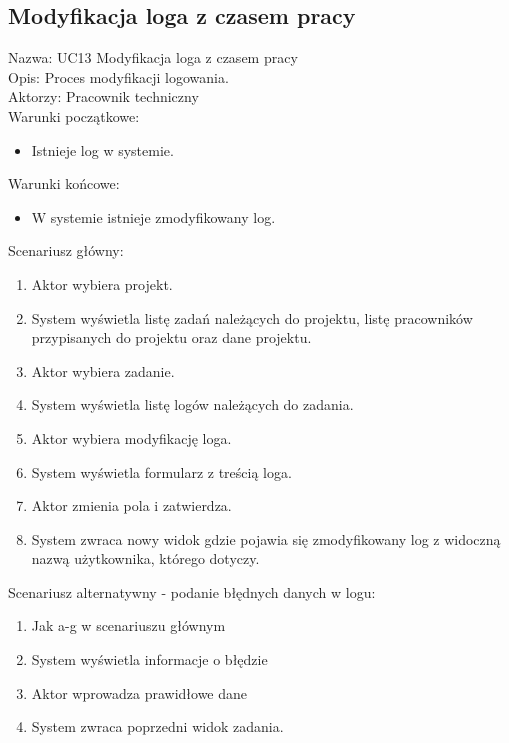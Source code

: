 \subsection{Modyfikacja loga z czasem pracy}
\begin{adjustwidth}{5em}{0pt}
Nazwa: UC13 Modyfikacja loga z czasem pracy \\
Opis: Proces modyfikacji logowania.\\
Aktorzy: Pracownik techniczny \\
Warunki początkowe:
\begin{itemize}
\item Istnieje log w systemie.
\end{itemize}
Warunki końcowe:
\begin{itemize}
\item W systemie istnieje zmodyfikowany log.
\end{itemize}
Scenariusz główny:
\begin{enumerate}
\item Aktor wybiera projekt.
\item System wyświetla listę zadań należących do projektu, listę pracowników przypisanych do projektu oraz dane projektu.
\item Aktor wybiera zadanie.
\item System wyświetla listę logów należących do zadania.
\item Aktor wybiera modyfikację loga.
\item System wyświetla formularz z treścią loga.
\item Aktor zmienia pola i zatwierdza.
\item System zwraca nowy widok gdzie pojawia się zmodyfikowany log z widoczną nazwą użytkownika, którego dotyczy.
\end{enumerate}
Scenariusz alternatywny - podanie błędnych danych w logu: 
\begin{enumerate}
\item Jak a-g w scenariuszu głównym
\item System wyświetla informacje o błędzie
\item Aktor wprowadza prawidłowe dane
\item System zwraca poprzedni widok zadania.
\end{enumerate}
\end{adjustwidth}

